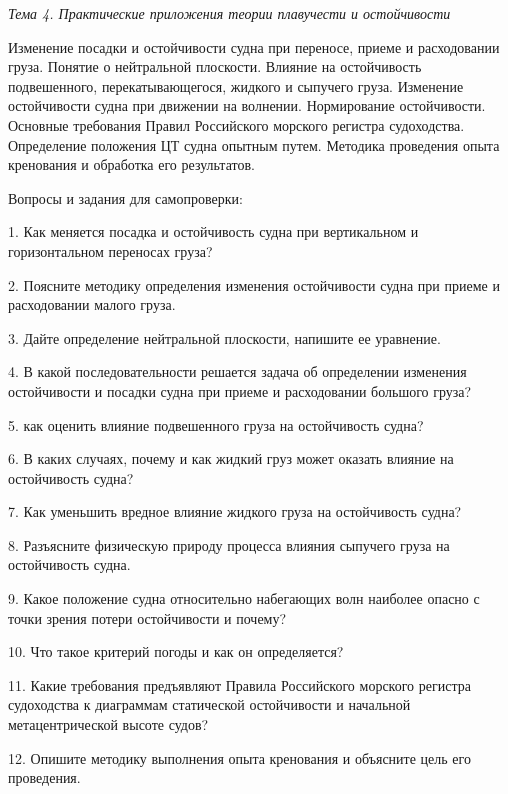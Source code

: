 \vspace{0.5cm}

\textit{Тема 4. Практические приложения теории плавучести и остойчивости}

Изменение посадки и остойчивости судна при переносе, приеме и расходовании груза.
Понятие о нейтральной плоскости.
Влияние на остойчивость подвешенного, перекатывающегося, жидкого и сыпучего груза.
Изменение остойчивости судна при движении на волнении.
Нормирование остойчивости.
Основные требования Правил Российского морского регистра судоходства.
Определение положения ЦТ судна опытным путем.
Методика проведения опыта кренования и обработка его результатов.

\vspace{0.5cm}

Вопросы и задания для самопроверки:

1.	Как меняется посадка и остойчивость судна при вертикальном и горизонтальном переносах груза?

2.	Поясните методику определения изменения остойчивости судна при приеме и расходовании малого груза.

3.	Дайте определение нейтральной плоскости, напишите ее уравнение.

4.	В какой последовательности решается задача об определении изменения остойчивости и посадки судна при приеме и расходовании большого груза?

5.	как оценить влияние подвешенного груза на остойчивость судна?

6.	В каких случаях, почему и как жидкий груз может оказать влияние на остойчивость судна?

7.	Как уменьшить вредное влияние жидкого груза на остойчивость судна?

8.	Разъясните физическую природу процесса влияния сыпучего груза на остойчивость судна.

9.	Какое положение судна относительно набегающих волн наиболее опасно с точки зрения потери остойчивости и почему?

10.	Что такое критерий погоды и как он определяется?

11.	Какие требования предъявляют Правила Российского морского регистра судоходства к диаграммам статической остойчивости и начальной метацентрической высоте судов?

12.	Опишите методику выполнения опыта кренования и объясните цель его проведения.

\vspace{0.5cm}

